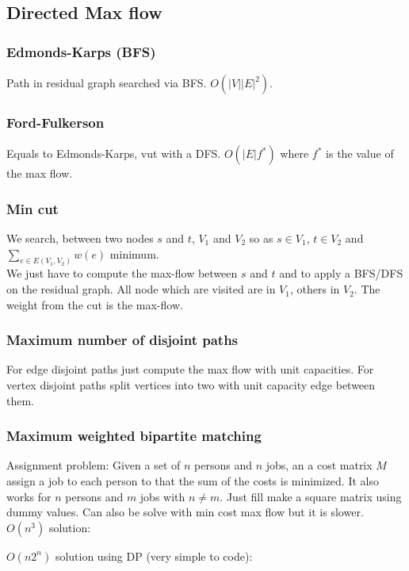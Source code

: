 \subsection{Directed Max flow}
\subsubsection{Edmonds-Karps (BFS)}
Path in residual graph searched via BFS. $O(|V||E|^2)$.\\

\subsubsection{Ford-Fulkerson}
Equals to Edmonds-Karps, vut with a DFS. $O(|E|f^*)$ where $f^*$ is the value of the max flow.

\subsubsection{Min cut}
We search, between two nodes $s$ and $t$, $V_1$ and $V_2$ so as $s\in V_1$, $t\in V_2$ and $\sum_{e \in E(V_1, V_2)} w(e)$ minimum.\\
We just have to compute the max-flow between $s$ and $t$ and to apply a BFS/DFS on the residual graph. All node which are visited are in $V_1$, others in $V_2$. The weight from the cut is the max-flow.
\subsubsection{Maximum number of disjoint paths} For edge disjoint paths just compute the max flow with unit capacities. For vertex disjoint paths split vertices into two with unit capacity edge between them.
\subsubsection{Maximum weighted bipartite matching}
Assignment problem: Given a set of $n$ persons and $n$ jobs, an a cost matrix $M$ assign a job to each person to that the sum of the costs is minimized. It also works for $n$ persons and $m$ jobs with $n \neq m$. Just fill make a square matrix using dummy values. Can also be solve with min cost max flow but it is slower. \\

$O(n^3)$ solution:

\vspace{0.5cm}
$O(n 2^n)$ solution using DP (very simple to code):



